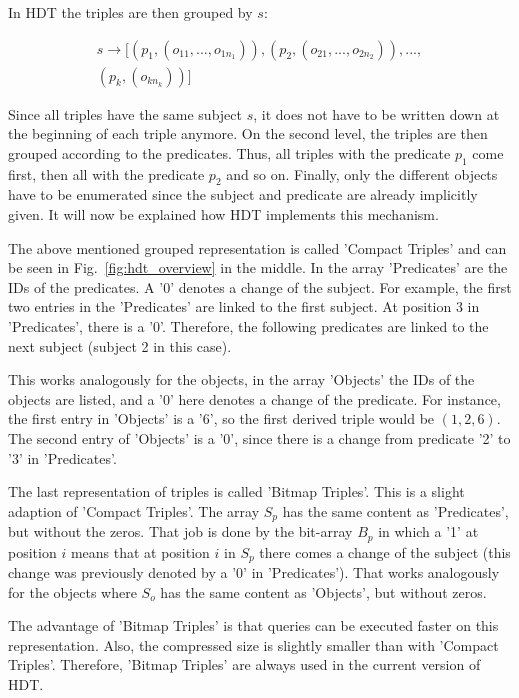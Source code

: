 In HDT the triples are then grouped by $s$:

\begin{align*}
s \to [(p_1,(o_{11},...,o_{1n_1})),(p_2,(o_{21},...,o_{2n_2})),...,\\
 (p_k , (o_{kn_k} ))]
\end{align*}

Since all triples have the same subject $s$, it does not have to be written down at the beginning of each triple anymore. On the second level, the triples are then grouped according to the predicates. Thus, all triples with the predicate $p_1$ come first, then all with the predicate $p_2$ and so on. Finally, only the different objects have to be enumerated since the subject and predicate are already implicitly given. It will now be explained how HDT implements this mechanism.

The above mentioned grouped representation is called 'Compact Triples' and can be seen in Fig.~\ref{fig:hdt_overview} in the middle. In the array 'Predicates' are the IDs of the predicates. A '0' denotes a change of the subject. For example, the first two entries in the 'Predicates' are linked to the first subject. At position 3 in 'Predicates', there is a '0'. Therefore, the following predicates are linked to the next subject (subject 2 in this case).

This works analogously for the objects, in the array 'Objects' the IDs of the objects are listed, and a '0' here denotes a change of the predicate. For instance, the first entry in 'Objects' is a '6', so the first derived triple would be $(1,2,6)$. The second entry of 'Objects' is a '0', since there is a change from predicate '2' to '3' in 'Predicates'.

The last representation of triples is called 'Bitmap Triples'.  This is a slight adaption of 'Compact Triples'. The array $S_p$ has the same content as 'Predicates', but without the zeros. That job is done by the bit-array $B_p$ in which a '1' at position $i$ means that at position $i$ in $S_p$ there comes a change of the subject (this change was previously denoted by a '0' in 'Predicates'). That works analogously for the objects where $S_o$ has the same content as 'Objects', but without zeros.

The advantage of 'Bitmap Triples' is that queries can be executed faster on this representation. Also, the compressed size is slightly smaller than with 'Compact Triples'. Therefore, 'Bitmap Triples' are always used in the current version of HDT.

